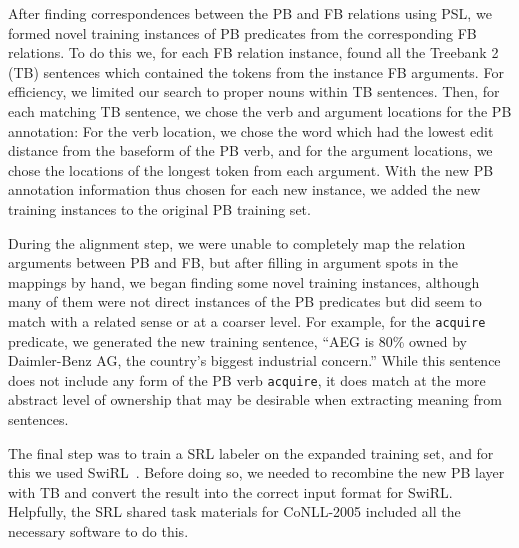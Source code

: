 After finding correspondences between the PB and FB relations using PSL, we formed novel training instances of PB predicates from the corresponding FB relations.
To do this we, for each FB relation instance, found all the Treebank 2 (TB) sentences which contained the tokens from the instance FB arguments.
For efficiency, we limited our search to proper nouns within TB sentences.
Then, for each matching TB sentence, we chose the verb and argument locations for the PB annotation:  For the verb location, we chose the word which had the lowest edit distance from the baseform of the PB verb, and for the argument locations, we chose the locations of the longest token from each argument.
With the new PB annotation information thus chosen for each new instance, we added the new training instances to the original PB training set.

During the alignment step, we were unable to completely map the relation arguments between PB and FB, but after filling in argument spots in the mappings by hand, we began finding some novel training instances, although many of them were not direct instances of the PB predicates but did seem to match with a related sense or at a coarser level.
For example, for the {\tt acquire} predicate, we generated the new training sentence, “AEG is 80\% owned by Daimler-Benz AG, the country's biggest industrial concern.”
While this sentence does not include any form of the PB verb {\tt acquire}, it does match at the more abstract level of ownership that may be desirable when extracting meaning from sentences.

The final step was to train a SRL labeler on the expanded training set, and for this we used SwiRL~\cite{surdeanu_combination_2007}.
Before doing so, we needed to recombine the new PB layer with TB and convert the result into the correct input format for SwiRL.  Helpfully, the SRL shared task materials for CoNLL-2005 included all the necessary software to do this.

